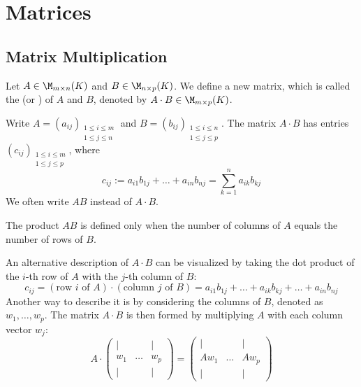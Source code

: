 \setcounter{chapter}{16}
\chapter{Matrices}

\section{Matrix Multiplication}

\begin{definition}
Let $A \in \M_{m \times n}(K)$ and $B \in \M_{n \times p}(K)$. We define a new matrix, which is called the  (or ) of $A$ and $B$, denoted by $A \cdot B \in \M_{m \times p}(K)$.

Write $A = (a_{ij})_{\substack{1 \le i \le m \\ 1 \le j \le n}}$ and $B = (b_{ij})_{\substack{1 \le i \le n \\ 1 \le j \le p}}$. The matrix $A \cdot B$ has entries $(c_{ij})_{\substack{1 \le i \le m \\ 1 \le j \le p}}$, where
\begin{equation*}
    c_{ij} := a_{i1}b_{1j} + \dots + a_{in}b_{nj} = \sum_{k=1}^{n} a_{ik}b_{kj}
\end{equation*}
We often write $AB$ instead of $A \cdot B$. 
\end{definition}

\begin{importantremark}
The product $AB$ is defined only when the number of columns of $A$ equals the number of rows of $B$.
\end{importantremark}

An alternative description of $A \cdot B$ can be visualized by taking the dot product of the $i$-th row of $A$ with the $j$-th column of $B$:
\begin{equation*}
    c_{ij} = (\text{row } i \text{ of } A) \cdot (\text{column } j \text{ of } B) = a_{i1}b_{1j} + \dots + a_{ik}b_{kj} + \dots + a_{in}b_{nj}
\end{equation*}
Another way to describe it is by considering the columns of $B$, denoted as $w_1, \dots, w_p$. The matrix $A \cdot B$ is then formed by multiplying $A$ with each column vector $w_j$:
\begin{equation*}
    A \cdot \begin{pmatrix} | & & | \\ w_1 & \dots & w_p \\ | & & | \end{pmatrix} = \begin{pmatrix} | & & | \\ A w_1 & \dots & A w_p \\ | & & | \end{pmatrix}
\end{equation*}


